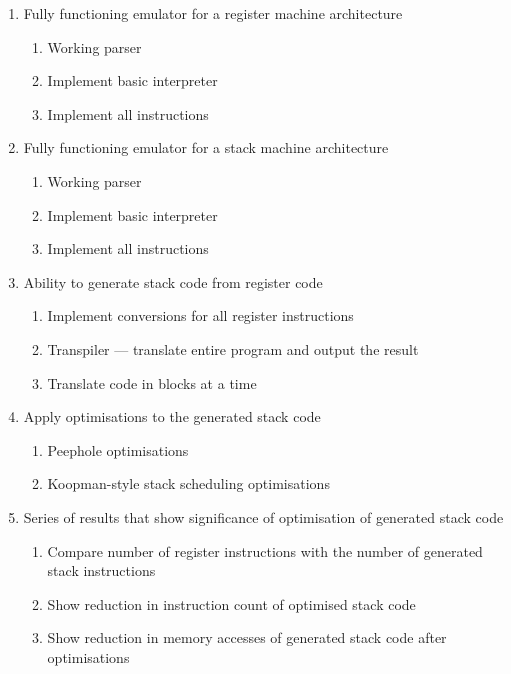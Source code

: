 \begin{enumerate}[noitemsep,label=R\arabic*]
  \item Fully functioning emulator for a register machine
    architecture\label{itm:register}
  \begin{enumerate}[noitemsep,label=\theenumi.\arabic*]
    \item Working parser
    \item Implement basic interpreter
    \item Implement all instructions
  \end{enumerate}
  \item Fully functioning emulator for a stack machine
    architecture\label{itm:stack}
  \begin{enumerate}[noitemsep,label=\theenumi.\arabic*]
    \item Working parser
    \item Implement basic interpreter
    \item Implement all instructions
  \end{enumerate}
  \item Ability to generate stack code from register code\label{itm:generate}
  \begin{enumerate}[noitemsep,label=\theenumi.\arabic*]
    \item Implement conversions for all register instructions
    \item Transpiler --- translate entire program and output the result
    \item Translate code in blocks at a time
  \end{enumerate}
  \item Apply optimisations to the generated stack code\label{itm:optimise}
  \begin{enumerate}[noitemsep,label=\theenumi.\arabic*]
    \item Peephole optimisations~\cite{McKeeman1965Peephole}
    \item Koopman-style stack scheduling
      optimisations~\cite{Koopman1995Preliminary}
  \end{enumerate}
  \item Series of results that show significance of optimisation of generated
    stack code\label{itm:results}
  \begin{enumerate}[noitemsep,label=\theenumi.\arabic*]
    \item Compare number of register instructions with the number of generated
      stack instructions
    \item Show reduction in instruction count of optimised stack code
    \item Show reduction in memory accesses of generated stack code after
      optimisations
  \end{enumerate}
\end{enumerate}

